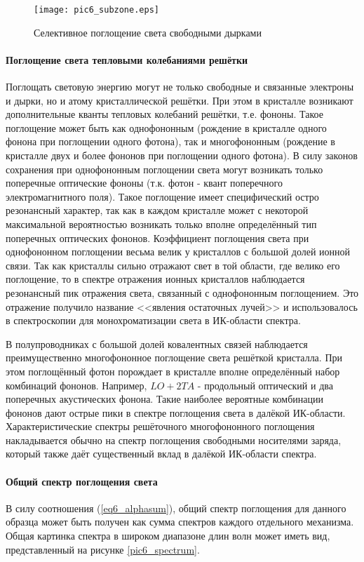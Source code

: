 \begin{figure}[h!]\centering
\texttt{[image: pic6\_subzone.eps]}
\caption{Селективное поглощение света свободными дырками}
\label{pic6_subzone}
\end{figure}

\paragraph{Поглощение света тепловыми колебаниями решётки}
Поглощать световую энергию могут не только свободные и связанные электроны и дырки, но и атому кристаллической решётки. При этом в кристалле возникают дополнительные кванты тепловых колебаний решётки, т.е. фононы. Такое поглощение может быть как однофононным (рождение в кристалле одного фонона при поглощении одного фотона), так и многофононным (рождение в кристалле двух и более фононов при поглощении одного фотона). В силу законов сохранения при однофононным поглощении света могут возникать только поперечные оптические фононы (т.к. фотон - квант поперечного электромагнитного поля). Такое поглощение имеет специфический остро резонансный характер, так как в каждом кристалле может с некоторой максимальной вероятностью возникать только вполне определённый тип поперечных оптических фононов. Коэффициент поглощения света при однофононном поглощении весьма велик у кристаллов с большой долей ионной связи. Так как кристаллы сильно отражают свет в той области, где велико его поглощение, то в спектре отражения ионных кристаллов наблюдается резонансный пик отражения света, связанный с однофононным поглощением. Это отражение получило название <<явления остаточных лучей>> и использовалось в спектроскопии для монохроматизации света в ИК-области спектра.

В полупроводниках с большой долей ковалентных связей наблюдается преимущественно многофононное поглощение света решёткой кристалла. При этом поглощённый фотон порождает в кристалле вполне определённый набор комбинаций фононов. Например, $LO + 2 TA$ - продольный оптический и два поперечных акустических фонона. Такие наиболее вероятные комбинации фононов дают острые пики в спектре поглощения света в далёкой ИК-области. Характеристические спектры решёточного многофононного поглощения накладывается обычно на спектр поглощения свободными носителями заряда, который также даёт существенный вклад в далёкой ИК-области спектра.

\paragraph{Общий спектр поглощения света}
В силу соотношения (\ref{eq6_alphasum}), общий спектр поглощения для данного образца может быть получен как сумма спектров каждого отдельного механизма. Общая картинка спектра в широком диапазоне длин волн может иметь вид, представленный на рисунке \ref{pic6_spectrum}.

